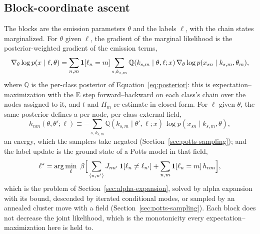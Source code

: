 \documentclass[11pt,a4paper]{article}
\begin{document}
\subsection{Block-coordinate ascent}
The blocks are the emission parameters $\theta$ and the labels $\ell$, with the
chain states marginalized. For $\theta$ given $\ell$, the gradient of the
marginal likelihood is the posterior-weighted gradient of the emission terms,
\begin{equation}
  \nabla_{\theta} \log p(x \mid \ell, \theta)
    = \sum_{n, m} \mathbf{1}[\ell_n = m] \sum_{s, k_{s,m}}
      \mathbb{Q}(k_{s,m} \mid \theta, \ell; x)\,
      \nabla_{\theta} \log p(x_{sn} \mid k_{s,m}, \theta_m),
  \label{eq:coupled-m-step}
\end{equation}
where $\mathbb{Q}$ is the per-class posterior of Equation~\ref{eq:posterior}:
this is expectation--maximization with the E step forward--backward on each
class's chain over the nodes assigned to it, and $t$ and $\Pi_m$ re-estimate
in closed form. For $\ell$ given $\theta$, the same posterior defines a
per-node, per-class external field,
\begin{equation}
  h_{nm}(\theta, \theta'; \ell) \equiv
    - \sum_{s, k_{s,m}} \mathbb{Q}(k_{s,m} \mid \theta', \ell; x)\,
      \log p(x_{sn} \mid k_{s,m}, \theta),
  \label{eq:external-field}
\end{equation}
an energy, which the samplers take negated
(Section~\ref{sec:potts-sampling}); and the label update is the ground state of a Potts model in that field,
\begin{equation}
  \ell^\star = \arg\min_{\ell}\ \beta \Big[
      \sum_{\langle n,n' \rangle} J_{nn'}\,\mathbf{1}[\ell_n \ne \ell_{n'}]
    + \sum_{n, m} \mathbf{1}[\ell_n = m]\, h_{nm} \Big],
  \label{eq:label-ground-state}
\end{equation}
which is the problem of Section~\ref{sec:alpha-expansion}, solved by
alpha expansion with its bound, descended by iterated conditional modes, or
sampled by an annealed cluster move with a field
(Section~\ref{sec:potts-sampling}). Each block does not decrease the joint
likelihood, which is the monotonicity every expectation--maximization here is
held to.
\end{document}
